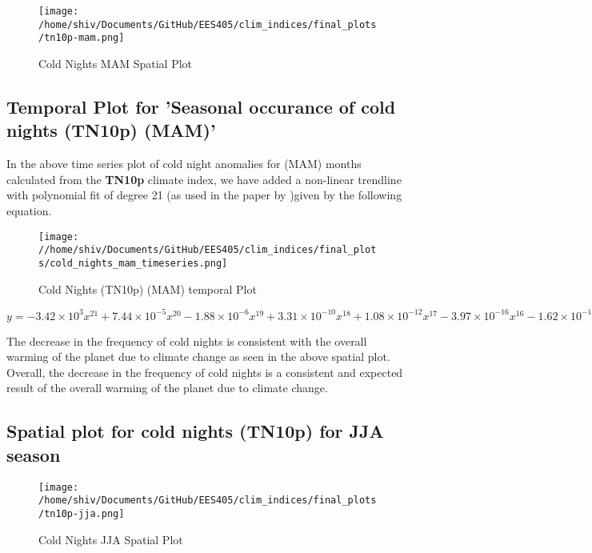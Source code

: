 \documentclass[a4paper, 12pt, twoside]{report}
\begin{document}
\begin{figure}[htb]
    \centering
    \texttt{[image: /home/shiv/Documents/GitHub/EES405/clim\_indices/final\_plots/tn10p-mam.png]}
    \caption{Cold Nights MAM Spatial Plot}
    \label{fig:tn10p_mam_spatial}
\end{figure}

\subsection{Temporal Plot for 'Seasonal occurance of cold nights (TN10p) (MAM)'}
In the above time series plot of cold night anomalies for (MAM) months calculated from the \textbf{TN10p} climate index, we have added a non-linear trendline with polynomial fit of degree 21 (as used in the paper by )given by the following equation.
\begin{figure}[htb]
    \centering
    \texttt{[image: //home/shiv/Documents/GitHub/EES405/clim\_indices/final\_plots/cold\_nights\_mam\_timeseries.png]}
    \caption{Cold Nights (TN10p) (MAM) temporal Plot}
    \label{fig:tn10p_mam_temporal}
\end{figure}

$ y = -3.42\times10^{3}x^{21}+7.44\times10^{-5}x^{20}-1.88\times10^{-6}x^{19}+3.31\times10^{-10}x^{18}+1.08\times10^{-12}x^{17}-3.97\times10^{-16}x^{16}-1.62\times10^{-19}x^{15}+1.05\times10^{-22}x^{14}-5.80\times10^{-27}x^{13}-8.00\times10^{-30}x^{12}+2.29\times10^{-33}x^{11}-1.20\times10^{-37}x^{10}-6.72\times10^{-41}x^{9}+1.99\times10^{-44}x^{8}-2.95\times10^{-48}x^{7}+2.85\times10^{-52}x^{6}-1.92\times10^{-56}x^{5}+9.12\times10^{-61}x^{4}-3.03\times10^{-65}x^{3}+6.69\times10^{-70}x^{2}-8.87\times10^{-75}x+5.34\times10^{-80}$

The decrease in the frequency of cold nights is consistent with the overall warming of the planet due to climate change as seen in the above spatial plot.\\
Overall, the decrease in the frequency of cold nights is a consistent and expected result of the overall warming of the planet due to climate change.

\subsection{Spatial plot for cold nights (TN10p) for JJA season}

\begin{figure}[htb]
    \centering
    \texttt{[image: /home/shiv/Documents/GitHub/EES405/clim\_indices/final\_plots/tn10p-jja.png]}
    \caption{Cold Nights JJA Spatial Plot}
    \label{fig:tn10p_jja_spatial}
\end{figure}
\end{document}
